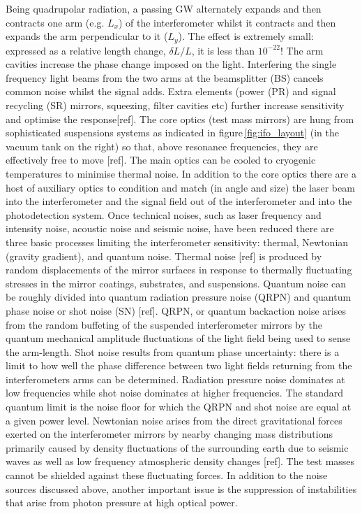 Being quadrupolar radiation, a passing GW alternately expands and then contracts one arm (e.g. $L_x$) of the interferometer whilst it contracts and then expands the arm perpendicular to it ($L_y$).  The effect is extremely small: expressed as a relative length change, $\delta L/L$, it is less than $10^{-22}$! The arm cavities increase the phase change imposed on the light. Interfering the single frequency light beams from the two arms at the beamsplitter (BS) cancels common noise whilst the signal adds. Extra elements (power (PR) and signal recycling (SR) mirrors, squeezing, filter cavities etc)  further increase sensitivity and optimise the response[ref].  
The core optics (test mass mirrors) are hung from sophisticated suspensions systems as indicated in figure\,\ref{fig:ifo_layout} (in the vacuum tank on the right) so that, above resonance frequencies, they are effectively free to move [ref]. The main optics can be cooled to cryogenic temperatures to minimise thermal noise. In addition to the  core optics there are a host of auxiliary optics to condition  and match (in angle and size) the laser beam into the interferometer  and the signal field out of the interferometer and into the photodetection system. Once technical noises, such as laser frequency and intensity noise, acoustic noise and seismic noise, have been reduced there are three basic processes limiting the interferometer sensitivity: thermal, Newtonian (gravity gradient), and quantum noise. Thermal noise [ref] is produced by random displacements of the mirror surfaces in response to thermally fluctuating stresses in the mirror coatings, substrates, and suspensions. Quantum noise can be roughly divided into quantum radiation pressure noise (QRPN) and quantum phase noise or shot noise (SN) [ref]. QRPN, or quantum backaction noise arises from the random buffeting of the suspended interferometer mirrors by the quantum mechanical amplitude fluctuations of the light field being used to sense the arm-length. Shot noise results from quantum phase uncertainty: there is a limit to how well the phase difference between two light fields returning from the interferometers arms can be determined. Radiation pressure noise dominates at low frequencies while shot noise dominates at higher frequencies. The standard quantum limit is the noise floor for which the QRPN and shot noise are equal at a given power level. Newtonian noise arises from the direct gravitational forces exerted on the interferometer mirrors by nearby changing mass distributions primarily caused by density fluctuations of the surrounding earth due to seismic waves as well as low frequency atmospheric density changes [ref]. The test masses cannot be shielded against these fluctuating forces.  In addition to the noise sources discussed above, another important issue is the suppression of instabilities that arise from photon pressure at high optical power. 

